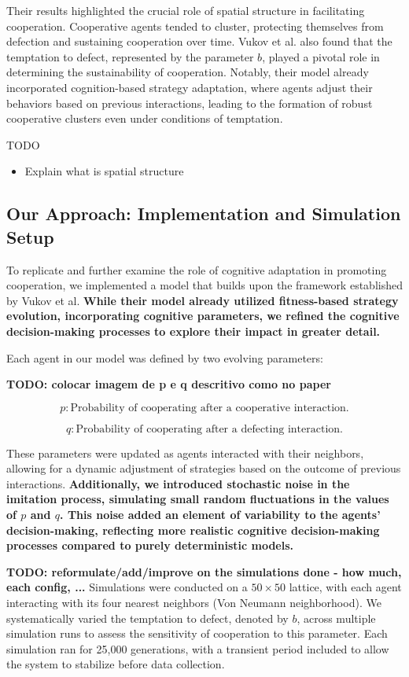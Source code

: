 \documentclass[runningheads]{llncs}
\begin{document}
Their results highlighted the crucial role of spatial structure in facilitating cooperation.
Cooperative agents tended to cluster, protecting themselves from defection and
sustaining cooperation over time. Vukov et al. also found that the temptation to
defect, represented by the parameter \( b \), played a pivotal role in determining
the sustainability of cooperation. Notably, their model already incorporated
cognition-based strategy adaptation, where agents adjust their behaviors based on
previous interactions, leading to the formation of robust cooperative clusters even
under conditions of temptation.


TODO
\begin{itemize}
    \item Explain what is spatial structure
\end{itemize}

\subsection{Our Approach: Implementation and Simulation Setup}

To replicate and further examine the role of cognitive adaptation in promoting cooperation, we implemented a model that builds upon the framework established by Vukov et al. \textbf{While their model already utilized fitness-based strategy evolution, incorporating cognitive parameters, we refined the cognitive decision-making processes to explore their impact in greater detail.}

Each agent in our model was defined by two evolving parameters:

\textbf{TODO: colocar imagem de p e q descritivo como no paper}

\[
p: \text{Probability of cooperating after a cooperative interaction.}
\]

\[
q: \text{Probability of cooperating after a defecting interaction.}
\]

These parameters were updated as agents interacted with their neighbors, allowing for a dynamic adjustment of strategies based on the outcome of previous interactions. \textbf{Additionally, we introduced stochastic noise in the imitation process, simulating small random fluctuations in the values of \( p \) and \( q \). This noise added an element of variability to the agents' decision-making, reflecting more realistic cognitive decision-making processes compared to purely deterministic models.}

\textbf{TODO: reformulate/add/improve on the simulations done - how much, each config, ...}
Simulations were conducted on a \( 50 \times 50 \) lattice, with each agent interacting with its four nearest neighbors (Von Neumann neighborhood). We systematically varied the temptation to defect, denoted by \( b \), across multiple simulation runs to assess the sensitivity of cooperation to this parameter. Each simulation ran for 25,000 generations, with a transient period included to allow the system to stabilize before data collection.
\end{document}
